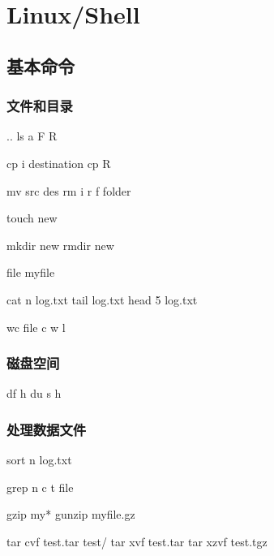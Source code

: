 \documentclass[letterpaper,10pt,english]{sphinxmanual}
\begin{document}
\chapter{Linux/Shell}
\label{\detokenize{linux/index:linux-shell}}\label{\detokenize{linux/index::doc}}

\section{基本命令}
\label{\detokenize{linux/01_basic::doc}}\label{\detokenize{linux/01_basic:id1}}

\subsection{文件和目录}
\label{\detokenize{linux/01_basic:id2}}
%
\begin{sphinxVerbatim}[commandchars=\\\{\}]
 ..
ls \PYGZhy{}a \PYGZhy{}F \PYGZhy{}R

cp \PYG{o}{[}\PYGZhy{}i\PYG{o}{]}  destination
cp \PYGZhy{}R

mv src des
rm \PYGZhy{}i \PYGZhy{}r \PYGZhy{}f folder

touch new 

mkdir new
rmdir new

file my\PYGZus{}file 

cat \PYGZhy{}n log.txt
tail log.txt
head \PYGZhy{}5 log.txt

wc file \PYGZhy{}c \PYGZhy{}w \PYGZhy{}l
\end{sphinxVerbatim}


\subsection{磁盘空间}
\label{\detokenize{linux/01_basic:id3}}
%
\begin{sphinxVerbatim}[commandchars=\\\{\}]
df \PYGZhy{}h
du \PYG{o}{[}\PYGZhy{}s\PYG{o}{]} \PYGZhy{}h
\end{sphinxVerbatim}


\subsection{处理数据文件}
\label{\detokenize{linux/01_basic:id4}}
%
\begin{sphinxVerbatim}[commandchars=\\\{\}]
sort \PYG{o}{[}\PYGZhy{}n\PYG{o}{]} log.txt

grep \PYG{o}{[}\PYGZhy{}n\PYG{o}{]} \PYG{o}{[}\PYGZhy{}c\PYG{o}{]} t file 

gzip my*
gunzip myfile.gz

tar \PYGZhy{}cvf test.tar test/
tar \PYGZhy{}xvf test.tar
tar \PYGZhy{}xzvf test.tgz
\end{sphinxVerbatim}
\end{document}
